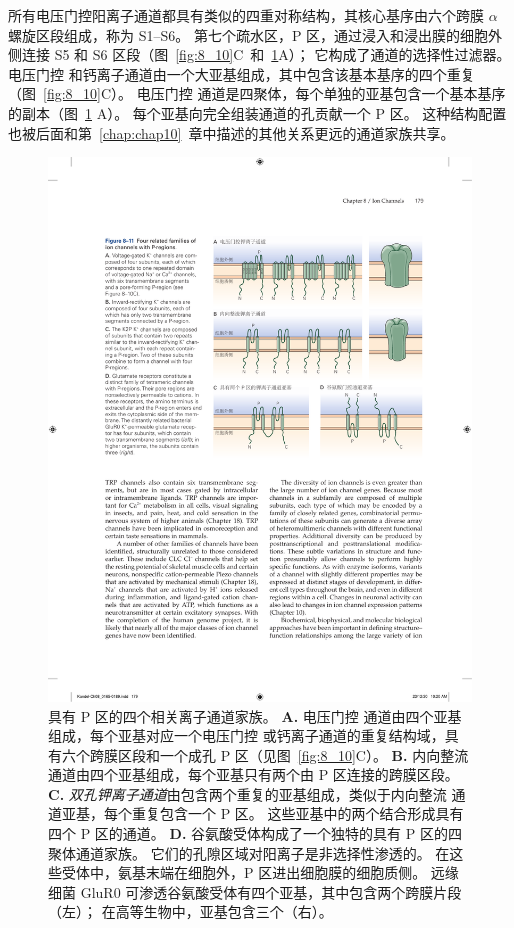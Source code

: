 所有电压门控阳离子通道都具有类似的四重对称结构，其核心基序由六个跨膜 $\alpha$ 螺旋区段组成，称为 S1–S6。
第七个疏水区，P 区，通过浸入和浸出膜的细胞外侧连接 S5 和 S6 区段（图~\ref{fig:8_10}C~和~\ref{fig:8_11}A）；
它构成了通道的选择性过滤器。
电压门控  和钙离子通道由一个大亚基组成，其中包含该基本基序的四个重复（图~\ref{fig:8_10}C）。 
电压门控  通道是四聚体，每个单独的亚基包含一个基本基序的副本（图~\ref{fig:8_11} A）。
每个亚基向完全组装通道的孔贡献一个 P 区。
这种结构配置也被后面和第~\ref{chap:chap10}~章中描述的其他关系更远的通道家族共享。


\begin{figure}[htbp]
	\centering
	\includegraphics[width=0.75\linewidth]{chap08/fig_8_11}
	\caption{具有 P 区的四个相关离子通道家族。
		\textbf{A.} 电压门控  通道由四个亚基组成，每个亚基对应一个电压门控  或钙离子通道的重复结构域，具有六个跨膜区段和一个成孔 P 区（见图~\ref{fig:8_10}C）。
		\textbf{B.} 内向整流  通道由四个亚基组成，每个亚基只有两个由 P 区连接的跨膜区段。
		\textbf{C.} \textit{双孔钾离子通道}由包含两个重复的亚基组成，类似于内向整流  通道亚基，每个重复包含一个 P 区。
		这些亚基中的两个结合形成具有四个 P 区的通道。
		\textbf{D.} 谷氨酸受体构成了一个独特的具有 P 区的四聚体通道家族。
		它们的孔隙区域对阳离子是非选择性渗透的。
		在这些受体中，氨基末端在细胞外，P 区进出细胞膜的细胞质侧。
		远缘细菌 GluR0  可渗透谷氨酸受体有四个亚基，其中包含两个跨膜片段（左）；
		在高等生物中，亚基包含三个（右）。}
	\label{fig:8_11}
\end{figure}



